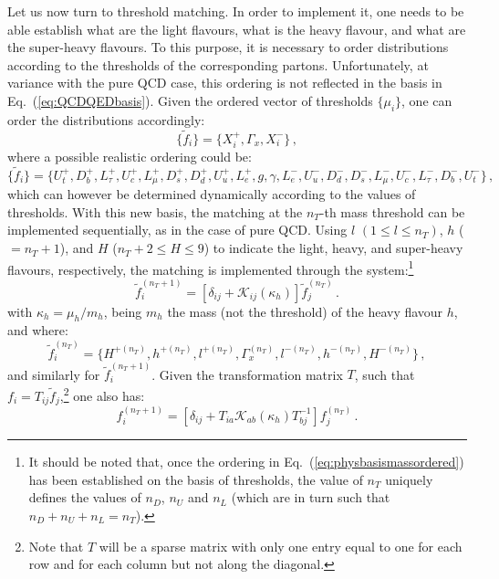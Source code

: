 \documentclass[10pt,a4paper]{article}
\begin{document}
Let us now turn to threshold matching. In order to implement it, one
needs to be able establish what are the light flavours, what is the
heavy flavour, and what are the super-heavy flavours. To this purpose,
it is necessary to order distributions according to the thresholds of
the corresponding partons. Unfortunately, at variance with the pure
QCD case, this ordering is not reflected in the basis in
Eq.~(\ref{eq:QCDQEDbasis}). Given the ordered vector of thresholds
$\{\mu_i\}$, one can order the distributions accordingly:
\begin{equation}
  \{\widetilde{f}_i\}=\{X_i^+,\Gamma_x,X_i^-\}\,,
\label{eq:physbasismassordered}
\end{equation}
where a possible realistic ordering could be:
\begin{equation}
\{\widetilde{f}_i\}=\{U_t^+, D_b^+, L_\tau^+, U_c^+, L_\mu^+, D_s^+, D_d^+, U_u^+,L_e^+,g,\gamma, L_e^-,U_u^-, D_d^-,  D_s^-, L_\mu^-, U_c^-, L_\tau^-,D_b^-, U_t^-\}\,,
\end{equation}
which can however be determined dynamically according to the values of
thresholds. With this new basis, the matching at the $n_T$-th mass
threshold can be implemented sequentially, as in the case of pure
QCD. Using $l$ $(1\leq l \leq n_T)$, $h$ ($=n_T+1$), and $H$
($n_T+2\leq H \leq 9$) to indicate the light, heavy, and super-heavy
flavours, respectively, the matching is implemented through the
system:\footnote{It should be noted that, once the ordering in
  Eq.~(\ref{eq:physbasismassordered}) has been established on the
  basis of thresholds, the value of $n_T$ uniquely defines the values
  of $n_D$, $n_U$ and $n_L$ (which are in turn such that
  $n_D+n_U+n_L=n_T$).}
\begin{equation}
  \widetilde{f}_i^{(n_T+1)} = \left[\delta_{ij}+\mathcal{K}_{ij}(\kappa_h)\right] \widetilde{f}_j^{(n_T)}\,.
\end{equation}
with $\kappa_h=\mu_h/m_h$, being $m_h$ the mass (not the threshold) of
the heavy flavour $h$, and where:
\begin{equation}
\widetilde{f}_i^{(n_T)}=\{H^{+(n_T)},  h^{+(n_T)}, l^{+(n_T)}, \Gamma_x^{(n_T)}, l^{-(n_T)}, h^{-(n_T)}, H^{-(n_T)}\}\,,
\end{equation}
and similarly for $\widetilde{f}_i^{(n_T+1)}$. Given the
transformation matrix $T$, such that
$f_i=T_{ij}\widetilde{f}_j$,\footnote{Note that $T$ will be a sparse
  matrix with only one entry equal to one for each row and for each
  column but not along the diagonal.} one also has:
\begin{equation}
f_i^{(n_T+1)} = \left[\delta_{ij}+T_{ia}\mathcal{K}_{ab}(\kappa_h)T_{bj}^{-1}\right]f_j^{(n_T)}\,.
\end{equation}
\end{document}
